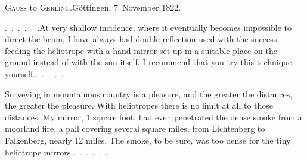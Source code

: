 \begin{center}
\textsc{Gauss} to \textsc{Gerling}.\quad Göttingen, 7~November 1822.
\end{center}

\par\noindent\hspace*{\parindent}\mbox{.\ .\ .\ .\ .\ .}\quad At very shallow incidence, where it eventually becomes impossible to direct the beam, I have always had double reflection used with the  success, feeding the heliotrope with a hand mirror set up in a suitable place on the ground instead of with the sun itself.
I recommend that you try this technique yourself.\quad\mbox{.\ .\ .\ .\ .\ .}

\par\noindent\hspace*{\parindent}Surveying in mountainous country is a pleasure, and the greater the distances, the greater the pleasure. With heliotropes there is no limit at all to those distances.
My  mirror, 1 square foot, had even penetrated the dense smoke from a moorland fire, a pall covering several square miles, from Lichtenberg to Falkenberg, nearly 12 miles. The smoke, to be sure, was too dense for the tiny heliotrope mirrors.\quad\mbox{.\ .\ .\ .\ .\ .}
